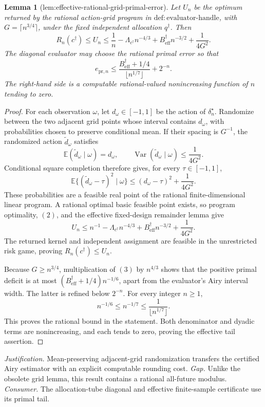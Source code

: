 \documentclass{article}
\newtheorem{lemma}{Lemma}
\begin{document}
{\begin{lemma}[lem:effective-rational-grid-primal-error]\label{lem:effective-rational-grid-primal-error}
Let \(U_n\) be the optimum returned by the rational action-grid program in
\(\mathrm{def:evaluator\text{-}handle}\), with
\(G=\lceil n^{3/4}\rceil\), under the fixed independent allocation
\(q^\dagger\).  Then
\[
R_n(c^\dagger)\le U_n
\le\frac1n-\Lambda_{c^\dagger}n^{-4/3}
+B_{\mathrm{eff}}^\dagger n^{-3/2}+\frac1{4G^2}.
\]
The diagonal evaluator may choose the rational primal error so that
\[
e_{\mathrm{pr},n}\le
\frac{B_{\mathrm{eff}}^\dagger+1/4}
{\lfloor n^{1/7}\rfloor}+2^{-n}.
\]
The right-hand side is a computable rational-valued nonincreasing function of \(n\) tending to zero.
\end{lemma}
\begin{proof}
For each observation \(\omega\), let \(d_\omega\in[-1,1]\) be the action of
\(\delta_n^\star\).  Randomize between the two adjacent grid points whose interval contains \(d_\omega\), with probabilities chosen to preserve conditional mean.  If their spacing is \(G^{-1}\), the randomized action
\(\widetilde d_\omega\) satisfies
\[
\mathbb E(\widetilde d_\omega\mid\omega)=d_\omega,
\qquad
\operatorname{Var}(\widetilde d_\omega\mid\omega)\le\frac1{4G^2}.
\tag{1}
\]
Conditional square completion therefore gives, for every
\(\tau\in[-1,1]\),
\[
\mathbb E\{(\widetilde d_\omega-\tau)^2\mid\omega\}
\le(d_\omega-\tau)^2+\frac1{4G^2}.
\tag{2}
\]
These probabilities are a feasible real point of the rational finite-dimensional linear program.  A rational optimal basic feasible point exists, so program optimality, \((2)\), and the effective fixed-design remainder lemma give
\[
U_n\le n^{-1}-\Lambda_{c^\dagger}n^{-4/3}
+B_{\mathrm{eff}}^\dagger n^{-3/2}+\frac1{4G^2}.
\tag{3}
\]
The returned kernel and independent assignment are feasible in the unrestricted risk game, proving \(R_n(c^\dagger)\le U_n\).

Because \(G\ge n^{3/4}\), multiplication of \((3)\) by \(n^{4/3}\) shows that the positive primal deficit is at most
\((B_{\mathrm{eff}}^\dagger+1/4)n^{-1/6}\), apart from the evaluator's Airy interval width.  The latter is refined below \(2^{-n}\).  For every integer \(n\ge1\),
\[
n^{-1/6}\le n^{-1/7}\le\frac1{\lfloor n^{1/7}\rfloor}.
\]
This proves the rational bound in the statement.  Both denominator and dyadic terms are nonincreasing, and each tends to zero, proving the effective tail assertion.
\end{proof}
\par\smallskip\noindent \textit{Justification.} Mean-preserving adjacent-grid randomization transfers the certified Airy estimator with an explicit computable rounding cost. \textit{Gap.} Unlike the obsolete grid lemma, this result contains a rational all-future modulus. \textit{Consumer.} The allocation-tube diagonal and effective finite-sample certificate use its primal tail.

}
\end{document}

